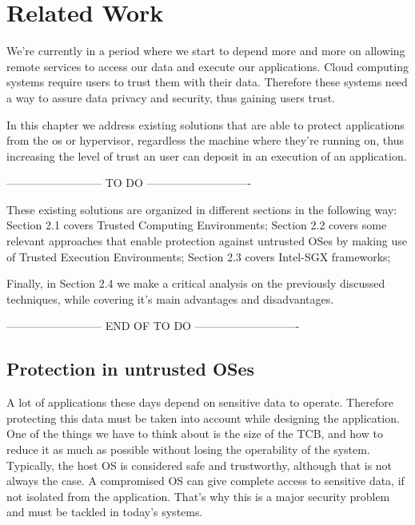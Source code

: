 \chapter{Related Work}
\label{cha:related_work}

We’re currently in a period where we start to depend more and more on allowing remote services to access our data and execute our applications. Cloud computing systems require users to trust them with their data. Therefore these systems need a way to assure data privacy
and security, thus gaining users trust.

In this chapter we address existing solutions that are able to protect applications from the \gls{os} or hypervisor, regardless the machine where they're running on, thus increasing the level of trust an user can deposit in an execution of an application.


-------------------------- TO DO ----------------------------

These existing solutions are organized in different sections in the following way: Section 2.1 covers Trusted Computing Environments; Section 2.2 covers some relevant approaches that enable protection against untrusted OSes by making use of Trusted Execution Environments; Section 2.3 covers Intel-SGX frameworks; 

Finally, in Section 2.4 we make a critical analysis on the previously discussed techniques, while covering it's main advantages and disadvantages.

-------------------------- END OF TO DO ----------------------------

\section{Protection in untrusted OSes}

A lot of applications these days depend on sensitive data to operate. Therefore protecting this data must be taken into account while designing the application. 
One of the things we have to think about is the size of the TCB, and how to reduce it as much as possible without losing the operability of the system. 
Typically, the host OS is considered safe and trustworthy, although that is not always the case. A compromised OS can give complete access to sensitive data, if not isolated from the application. That’s why this is a major security problem and must be tackled in today’s systems.

